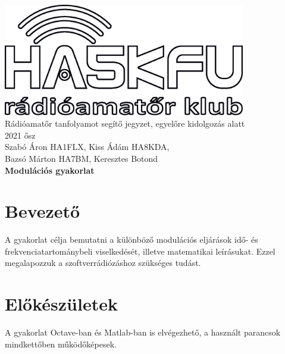 \documentclass[12pt,a4paper]{article}
\begin{document}
\begin{center}
\includegraphics[width=300pt,keepaspectratio]{figures/ha5kfu.eps}
\\[0.5cm]
Rádióamatőr tanfolyamot segítő jegyzet, egyelőre kidolgozás alatt \\
2021 ősz \\[0.5cm]
Szabó Áron HA1FLX, Kiss Ádám HA8KDA, \\ Bazsó Márton HA7BM, Keresztes Botond%
\\[1cm]

{\huge \bfseries Modulációs gyakorlat \\[0.5cm]}



\end{center}

\renewcommand{\contentsname}{Tartalom}\tableofcontents 
\newpage

\newpage

\section{Bevezető}
A gyakorlat célja bemutatni a különböző modulációs eljárások idő- és frekvenciatartománybeli viselkedését, illetve matematikai leírásukat. Ezzel megalapozzuk a szoftverrádiózáshoz szükséges tudást.

\section{Előkészületek}
A gyakorlat Octave-ban és Matlab-ban is elvégezhető, a használt parancsok mindkettőben működőképesek.
\end{document}
